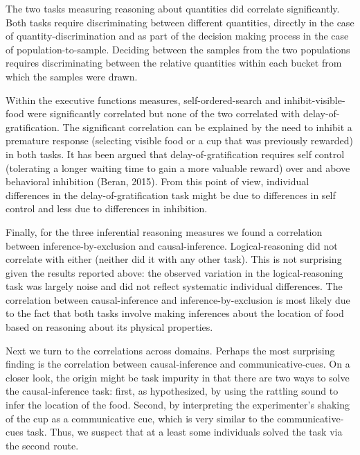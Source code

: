 \documentclass[
  man,floatsintext]{apa6}
\begin{document}
The two tasks measuring reasoning about quantities did correlate significantly. Both tasks require discriminating between different quantities, directly in the case of quantity-discrimination and as part of the decision making process in the case of population-to-sample. Deciding between the samples from the two populations requires discriminating between the relative quantities within each bucket from which the samples were drawn.

Within the executive functions measures, self-ordered-search and inhibit-visible-food were significantly correlated but none of the two correlated with delay-of-gratification. The significant correlation can be explained by the need to inhibit a premature response (selecting visible food or a cup that was previously rewarded) in both tasks. It has been argued that delay-of-gratification requires self control (tolerating a longer waiting time to gain a more valuable reward) over and above behavioral inhibition (Beran, 2015). From this point of view, individual differences in the delay-of-gratification task might be due to differences in self control and less due to differences in inhibition.

Finally, for the three inferential reasoning measures we found a correlation between inference-by-exclusion and causal-inference. Logical-reasoning did not correlate with either (neither did it with any other task). This is not surprising given the results reported above: the observed variation in the logical-reasoning task was largely noise and did not reflect systematic individual differences. The correlation between causal-inference and inference-by-exclusion is most likely due to the fact that both tasks involve making inferences about the location of food based on reasoning about its physical properties.

Next we turn to the correlations across domains. Perhaps the most surprising finding is the correlation between causal-inference and communicative-cues. On a closer look, the origin might be task impurity in that there are two ways to solve the causal-inference task: first, as hypothesized, by using the rattling sound to infer the location of the food. Second, by interpreting the experimenter's shaking of the cup as a communicative cue, which is very similar to the communicative-cues task. Thus, we suspect that at a least some individuals solved the task via the second route.
\end{document}

